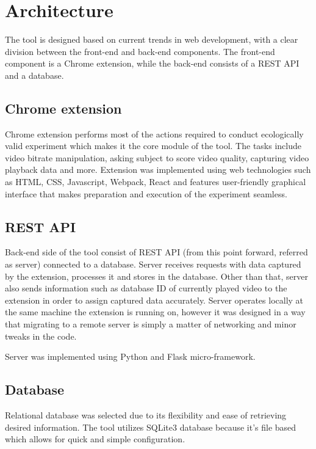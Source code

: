 \section{Architecture}
\label{sec:Architecture}
    The tool is designed based on current trends in web development, with a clear division between the front-end and back-end components. The front-end component is a Chrome extension, while the back-end consists of a REST API and a database.

    \subsection{Chrome extension}
        Chrome extension performs most of the actions required to conduct ecologically valid experiment which makes it the core module of the tool.
        The tasks include video bitrate manipulation, asking subject to score video quality, capturing video playback data and more.
        Extension was implemented using web technologies such as HTML, CSS, Javascript, Webpack, React and features user-friendly graphical interface that makes preparation and execution of the experiment seamless.
        
    \subsection{REST API}
        Back-end side of the tool consist of REST API (from this point forward, referred as server) connected to a database. Server receives requests with data captured by the extension, processes it and stores in the database. Other than that, server also sends information such as database ID of currently played video to the extension in order to assign captured data accurately.
        Server operates locally at the same machine the extension is running on, however it was designed in a way that migrating to a remote server is simply a matter of networking and minor tweaks in the code.
        
        Server was implemented using Python and Flask micro-framework.
    
    \subsection{Database}
        Relational database was selected due to its flexibility and ease of retrieving desired information. 
        The tool utilizes SQLite3 database because it's file based which allows for quick and simple configuration.